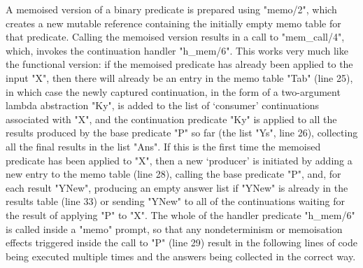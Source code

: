 A memoised version of a binary predicate is 
prepared using "memo/2", which creates a new mutable reference containing the initially
empty memo table for that predicate. Calling the memoised version results in a call to "mem_call/4", 
which, invokes the continuation handler "h_mem/6". This works very much like the
 functional version: if the memoised predicate has already been applied to
the input "X", then there will already be an entry in the memo table "Tab" (line 25), in which case the
newly captured continuation, in the form of a two-argument lambda abstraction "Ky", is added to the 
list of `consumer' continuations associated with "X", and the continuation predicate "Ky" is applied to all
the results produced by the base predicate "P" so far (the list "Ys", line 26), collecting all the 
final results in the list "Ans". If this is the first time the memoised predicate has been applied to 
"X", then a new `producer' is initiated  by adding a new entry to the memo table (line 28), calling the base
predicate "P", and, for each result "YNew", producing an empty answer list if "YNew" is 
already in the results table (line 33) or sending "YNew" to all of the continuations waiting for the
result of applying "P" to "X". The whole of the handler predicate "h_mem/6" is called inside a
"memo" prompt, so that any nondeterminism or memoisation effects triggered inside the call to "P" 
(line 29) result in the following lines of code being executed multiple times and the answers being collected
in the correct way.

